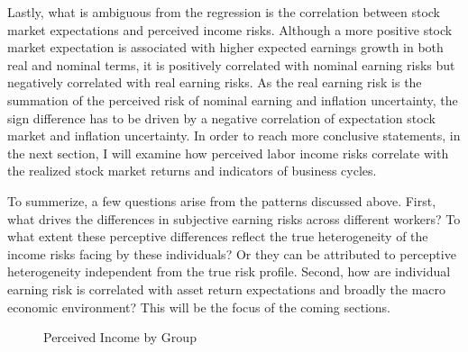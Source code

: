 \documentclass[12pt,notitlepage,onecolumn,aps,pra]{revtex4-1}
\begin{document}
Lastly, what is ambiguous from the regression is the correlation between
stock market expectations and perceived income risks. Although a more
positive stock market expectation is associated with higher expected
earnings growth in both real and nominal terms, it is positively
correlated with nominal earning risks but negatively correlated with
real earning risks. As the real earning risk is the summation of the
perceived risk of nominal earning and inflation uncertainty, the sign
difference has to be driven by a negative correlation of expectation
stock market and inflation uncertainty. In order to reach more
conclusive statements, in the next section, I will examine how perceived
labor income risks correlate with the realized stock market returns and
indicators of business cycles.

To summerize, a few questions arise from the patterns discussed above.
First, what drives the differences in subjective earning risks across
different workers? To what extent these perceptive differences reflect
the true heterogeneity of the income risks facing by these individuals?
Or they can be attributed to perceptive heterogeneity independent from
the true risk profile. Second, how are individual earning risk is
correlated with asset return expectations and broadly the macro economic
environment? This will be the focus of the coming sections.


    \begin{figure*}
        \begin{center}\end{center}
        \caption{Perceived Income by Group}
        \label{fig:boxplotbygroup}
    \end{figure*}
    
\end{document}
